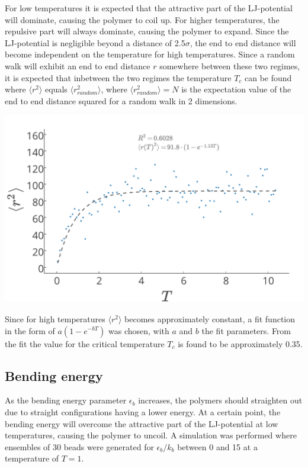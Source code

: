 For low temperatures it is expected that the attractive part of the LJ-potential will dominate, causing the polymer to coil up. For higher temperatures, the repulsive part will always dominate, causing the polymer to expand. Since the LJ-potential is negligible beyond a distance of 2.5$\sigma$, the end to end distance will become independent on the temperature for high temperatures. Since a random walk will exhibit an end to end distance $r$ somewhere between these two regimes, it is expected that inbetween the two regimes the temperature $T_c$ can be found where $\langle r^2 \rangle$ equals $\langle r_{random}^2 \rangle$, where $\langle r_{random}^2 \rangle = N$ is the expectation value of the end to end distance squared for a random walk in 2 dimensions.
\begin{Figure}
  \centerfloat
     \includegraphics[scale=0.4]{end_to_end_distance_as_function_of_the_temperature.pdf}
 \label{fig:end_to_end_afo_temperature}
\end{Figure} Since for high temperatures $\langle r^2 \rangle$ becomes approximately constant, a fit function in the form of $a(1-e^{-bT})$ was chosen, with $a$ and $b$ the fit parameters. From the fit the value for the critical temperature $T_c$ is found to be approximately 0.35.


\subsection{Bending energy}

As the bending energy parameter $\epsilon_b$ increases, the polymers should straighten out due to straight configurations having a lower energy. At a certain point, the bending energy will overcome the attractive part of the LJ-potential at low temperatures, causing the polymer to uncoil. A simulation was performed where ensembles of 30 beads were generated for $\epsilon_b/k_b$ between 0 and 15 at a temperature of $T = 1$.

